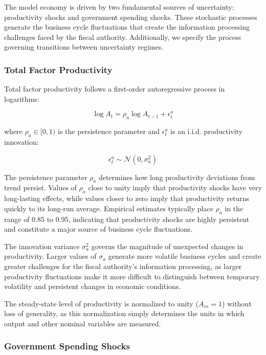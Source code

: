 \documentclass[5p,authoryear]{elsarticle}
\begin{document}
The model economy is driven by two fundamental sources of uncertainty: productivity shocks and government spending shocks. These stochastic processes generate the business cycle fluctuations that create the information processing challenges faced by the fiscal authority. Additionally, we specify the process governing transitions between uncertainty regimes.

\subsubsection{Total Factor Productivity}

Total factor productivity follows a first-order autoregressive process in logarithms:

\begin{equation}
\log A_t = \rho_a \log A_{t-1} + \epsilon_t^a
\label{eq:tfp_process}
\end{equation}

where $\rho_a \in [0,1)$ is the persistence parameter and $\epsilon_t^a$ is an i.i.d. productivity innovation:

\begin{equation}
\epsilon_t^a \sim \mathcal{N}(0, \sigma_a^2)
\label{eq:tfp_shock}
\end{equation}

The persistence parameter $\rho_a$ determines how long productivity deviations from trend persist. Values of $\rho_a$ close to unity imply that productivity shocks have very long-lasting effects, while values closer to zero imply that productivity returns quickly to its long-run average. Empirical estimates typically place $\rho_a$ in the range of 0.85 to 0.95, indicating that productivity shocks are highly persistent and constitute a major source of business cycle fluctuations.

The innovation variance $\sigma_a^2$ governs the magnitude of unexpected changes in productivity. Larger values of $\sigma_a$ generate more volatile business cycles and create greater challenges for the fiscal authority's information processing, as larger productivity fluctuations make it more difficult to distinguish between temporary volatility and persistent changes in economic conditions.

The steady-state level of productivity is normalized to unity ($A_{ss} = 1$) without loss of generality, as this normalization simply determines the units in which output and other nominal variables are measured.

\subsubsection{Government Spending Shocks}
\end{document}

